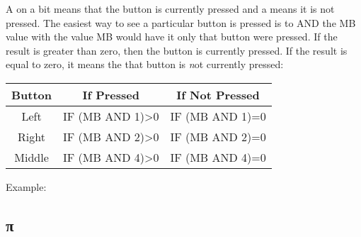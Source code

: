 \vspace{16pt}

A {} on a bit means that the button is currently pressed and a
{} means it is not pressed.  The easiest way to see a particular
button is pressed is to {\ttfamily AND} the {\ttfamily MB} value with the value
{\ttfamily MB} would have it only that button were pressed.  If the result is
greater than zero, then the button is currently pressed.  If the result is
equal to zero, it means the that button is {\emph not} currently pressed:\\

\begin{tabular}{|c|c|c|}
	\hline

	{\bfseries Button} & If Pressed & If Not Pressed\\ \hline

	Left & {\ttfamily IF (MB AND 1)>0} & {\ttfamily IF (MB AND 1)=0}\\ \hline
	Right & {\ttfamily IF (MB AND 2)>0} & {\ttfamily IF (MB AND 2)=0}\\ \hline
	Middle & {\ttfamily IF (MB AND 4)>0} & {\ttfamily IF (MB AND 4)=0}\\ \hline

\end{tabular}

\vspace{16pt}

Example:\\


\subsection{\ttfamily π}

